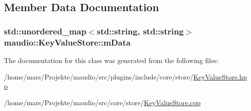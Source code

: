 \subsection{Member Data Documentation}
\hypertarget{classmaudio_1_1KeyValueStore_a024a720cf439988af3e689458bae9bb0}{
\subsubsection[{m\-Data}]{\setlength{\rightskip}{0pt plus 5cm}std\-::unordered\-\_\-map$<$std\-::string, std\-::string$>$ maudio\-::\-Key\-Value\-Store\-::m\-Data\hspace{0.3cm}{\ttfamily [protected]}}}\label{classmaudio_1_1KeyValueStore_a024a720cf439988af3e689458bae9bb0}


The documentation for this class was generated from the following files\-:\begin{DoxyCompactItemize}
\item 
/home/mars/\-Projekte/maudio/src/plugins/include/core/store/\hyperlink{KeyValueStore_8hpp}{Key\-Value\-Store.\-hpp}\item 
/home/mars/\-Projekte/maudio/src/core/store/\hyperlink{core_2store_2KeyValueStore_8cpp}{Key\-Value\-Store.\-cpp}\end{DoxyCompactItemize}
